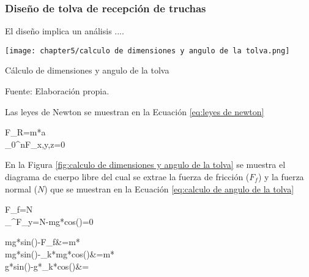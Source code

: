 \subsubsection{Diseño de tolva de recepción de truchas}

El diseño implica un análisis ....

\begin{myfigure}[H]
	\centering
	\texttt{[image: chapter5/calculo de dimensiones y angulo de la tolva.png]}
	\caption{Cálculo de dimensiones y angulo de la tolva}
	\begin{myflushleftportland}
		Fuente: Elaboración propia.
	\end{myflushleftportland}
	\label{fig:calculo de dimensiones y angulo de la tolva}
\end{myfigure}

Las leyes de Newton se muestran en la Ecuación \ref{eq:leyes de newton}

\begin{myequation}\label{eq:leyes de newton}
	\begin{split}
		F_{R}=m*a \\
		\sum_{0}^{n}F_{x,y,z}=0
	\end{split}
\end{myequation}

En la Figura \ref{fig:calculo de dimensiones y angulo de la tolva} se muestra el diagrama de cuerpo libre del cual se extrae la fuerza de fricción ($F_{f}$) y la fuerza normal ($N$) que se muestran en la Ecuación \ref{eq:calculo de angulo de la tolva}

\begin{myequation}\label{eq:calculo de angulo de la tolva}
	\begin{split}
		F_{f}=\mu*N  \\
		\sum_{}^{}F_{y}=N-mg*cos(\beta)=0
	\end{split}
\end{myequation}



\begin{myequation}\label{eq:calculo de angulo de la tolva2}
	\begin{split}
		mg*sin(\beta)-F_{f}&=m*\ddot{x} \\
		mg*sin(\beta)-\mu_{k}*mg*cos(\beta)&=m*\ddot{x} \\
		g*sin(\beta)-g*\mu_{k}*cos(\beta)&=\ddot{x}
	\end{split}
\end{myequation}

